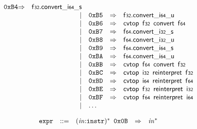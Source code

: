 $$\begin{array}{@{}l@{}rrlll@{}l@{}}
\mathtt{0xB4} &\Rightarrow& \mathsf{f{\scriptstyle32}} . {{{{\mathsf{convert}}{\mathsf{\_}}}{\mathsf{i{\scriptstyle64}}}}{\mathsf{\_}}}{\mathsf{s}} \\ &&|&
\mathtt{0xB5} &\Rightarrow& \mathsf{f{\scriptstyle32}} . {{{{\mathsf{convert}}{\mathsf{\_}}}{\mathsf{i{\scriptstyle64}}}}{\mathsf{\_}}}{\mathsf{u}} \\ &&|&
\mathtt{0xB6} &\Rightarrow& \mathsf{cvtop}~\,\mathsf{f{\scriptstyle32}}~\,\mathsf{convert}~\,\mathsf{f{\scriptstyle64}} \\ &&|&
\mathtt{0xB7} &\Rightarrow& \mathsf{f{\scriptstyle64}} . {{{{\mathsf{convert}}{\mathsf{\_}}}{\mathsf{i{\scriptstyle32}}}}{\mathsf{\_}}}{\mathsf{s}} \\ &&|&
\mathtt{0xB8} &\Rightarrow& \mathsf{f{\scriptstyle64}} . {{{{\mathsf{convert}}{\mathsf{\_}}}{\mathsf{i{\scriptstyle32}}}}{\mathsf{\_}}}{\mathsf{u}} \\ &&|&
\mathtt{0xB9} &\Rightarrow& \mathsf{f{\scriptstyle64}} . {{{{\mathsf{convert}}{\mathsf{\_}}}{\mathsf{i{\scriptstyle64}}}}{\mathsf{\_}}}{\mathsf{s}} \\ &&|&
\mathtt{0xBA} &\Rightarrow& \mathsf{f{\scriptstyle64}} . {{{{\mathsf{convert}}{\mathsf{\_}}}{\mathsf{i{\scriptstyle64}}}}{\mathsf{\_}}}{\mathsf{u}} \\ &&|&
\mathtt{0xBB} &\Rightarrow& \mathsf{cvtop}~\,\mathsf{f{\scriptstyle64}}~\,\mathsf{convert}~\,\mathsf{f{\scriptstyle32}} \\ &&|&
\mathtt{0xBC} &\Rightarrow& \mathsf{cvtop}~\,\mathsf{i{\scriptstyle32}}~\,\mathsf{reinterpret}~\,\mathsf{f{\scriptstyle32}} \\ &&|&
\mathtt{0xBD} &\Rightarrow& \mathsf{cvtop}~\,\mathsf{i{\scriptstyle64}}~\,\mathsf{reinterpret}~\,\mathsf{f{\scriptstyle64}} \\ &&|&
\mathtt{0xBE} &\Rightarrow& \mathsf{cvtop}~\,\mathsf{f{\scriptstyle32}}~\,\mathsf{reinterpret}~\,\mathsf{i{\scriptstyle32}} \\ &&|&
\mathtt{0xBF} &\Rightarrow& \mathsf{cvtop}~\,\mathsf{f{\scriptstyle64}}~\,\mathsf{reinterpret}~\,\mathsf{i{\scriptstyle64}} \\ &&|&
\dots \\
\end{array}
$$

\vspace{1ex}

$$
\begin{array}{@{}l@{}rrlll@{}l@{}}
& {\mathtt{expr}} &::=& {({\mathit{in}}{:}{\mathtt{instr}})^\ast}~\,\mathtt{0x0B} &\Rightarrow& {{\mathit{in}}^\ast} \\
\end{array}
$$

